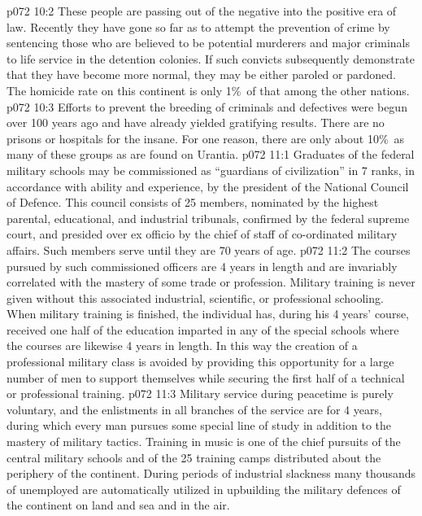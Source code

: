 \vs p072 10:2 These people are passing out of the negative into the positive era of law. Recently they have gone so far as to attempt the prevention of crime by sentencing those who are believed to be potential murderers and major criminals to life service in the detention colonies. If such convicts subsequently demonstrate that they have become more normal, they may be either paroled or pardoned. The homicide rate on this continent is only 1\%\ of that among the other nations.
\vs p072 10:3 Efforts to prevent the breeding of criminals and defectives were begun over 100 years ago and have already yielded gratifying results. There are no prisons or hospitals for the insane. For one reason, there are only about 10\%\ as many of these groups as are found on Urantia.
\vs p072 11:1 Graduates of the federal military schools may be commissioned as “guardians of civilization” in 7 ranks, in accordance with ability and experience, by the president of the National Council of Defence. This council consists of 25 members, nominated by the highest parental, educational, and industrial tribunals, confirmed by the federal supreme court, and presided over ex officio by the chief of staff of co\hyp{}ordinated military affairs. Such members serve until they are 70 years of age.
\vs p072 11:2 The courses pursued by such commissioned officers are 4 years in length and are invariably correlated with the mastery of some trade or profession. Military training is never given without this associated industrial, scientific, or professional schooling. When military training is finished, the individual has, during his 4 years’ course, received one half of the education imparted in any of the special schools where the courses are likewise 4 years in length. In this way the creation of a professional military class is avoided by providing this opportunity for a large number of men to support themselves while securing the first half of a technical or professional training.
\vs p072 11:3 Military service during peacetime is purely voluntary, and the enlistments in all branches of the service are for 4 years, during which every man pursues some special line of study in addition to the mastery of military tactics. Training in music is one of the chief pursuits of the central military schools and of the 25 training camps distributed about the periphery of the continent. During periods of industrial slackness many thousands of unemployed are automatically utilized in upbuilding the military defences of the continent on land and sea and in the air.
